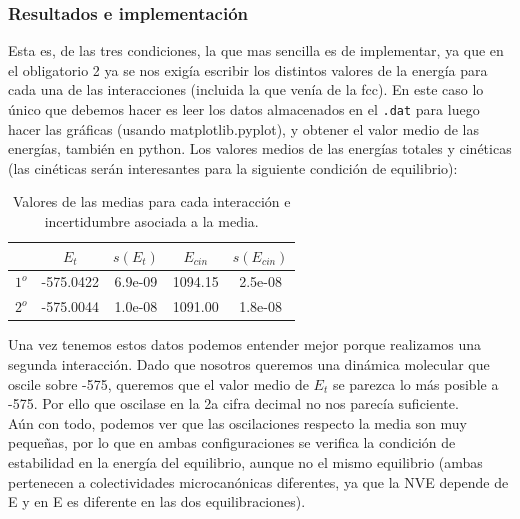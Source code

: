 \documentclass[11pt]{article} %
\begin{document}
\subsubsection{Resultados e implementación}

Esta es, de las tres condiciones, la que mas sencilla es de implementar, ya que en el obligatorio 2 ya se nos exigía escribir los distintos valores de la energía para cada una de las interacciones (incluida la que venía de la fcc). En este caso lo único que debemos hacer es leer los datos almacenados en el \texttt{.dat} para luego hacer las gráficas (usando matplotlib.pyplot), y obtener el valor medio de las energías, también en python. Los valores medios de las energías totales y cinéticas (las cinéticas serán interesantes para la siguiente condición de equilibrio):

\begin{table}[h!] \centering
	\begin{tabular}{c|c|c|c|c}
		& $E_t$ & $s(E_t)$ & $E_{cin}$ & $s(E_ {cin})$ \\ \hline
		$1^o$ &-575.0422 & 6.9e-09 & 1094.15 & 2.5e-08 \\ \hline
		$2^o$ & -575.0044 & 1.0e-08 & 1091.00 & 1.8e-08 
	\end{tabular}
	\caption{Valores de las medias para cada interacción e incertidumbre asociada a la media.}
	\label{Tab:01}
\end{table}
Una vez tenemos estos datos podemos entender mejor porque realizamos una segunda interacción. Dado que nosotros queremos una dinámica molecular que oscile sobre -575, queremos que el valor medio de $E_{t}$ se parezca lo más posible a -575. Por ello que oscilase en la 2a cifra decimal no nos parecía suficiente. \\

Aún con todo, podemos ver que las oscilaciones respecto la media son muy pequeñas, por lo que en ambas configuraciones se verifica la condición de estabilidad en la energía del equilibrio, aunque no el mismo equilibrio (ambas pertenecen a colectividades microcanónicas diferentes, ya que la NVE depende de E y en E es diferente en las dos equilibraciones).
\end{document}
